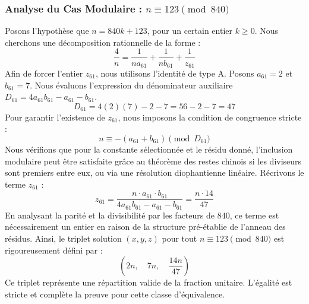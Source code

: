 \documentclass[11pt,a4paper]{article}
\theoremstyle{definition}
\theoremstyle{remark}
\begin{document}
\subsubsection{Analyse du Cas Modulaire : $n \equiv 123 \pmod{840}$}
Posons l'hypoth\`ese que $n = 840k + 123$, pour un certain entier $k \ge 0$. Nous cherchons une d\'ecomposition rationnelle de la forme :
\begin{equation}
\frac{4}{n} = \frac{1}{n a_{61}} + \frac{1}{n b_{61}} + \frac{1}{z_{61}}
\end{equation}
Afin de forcer l'entier $z_{61}$, nous utilisons l'identit\'e de type A. Posons $a_{61} = 2$ et $b_{61} = 7$.
Nous \'evaluons l'expression du d\'enominateur auxiliaire $D_{61} = 4a_{61}b_{61} - a_{61} - b_{61}$.
\begin{equation}
D_{61} = 4(2)(7) - 2 - 7 = 56 - 2 - 7 = 47
\end{equation}
Pour garantir l'existence de $z_{61}$, nous imposons la condition de congruence stricte :
\begin{equation}
n \equiv - (a_{61} + b_{61}) \pmod{D_{61}}
\end{equation}
Nous v\'erifions que pour la constante s\'electionn\'ee et le r\'esidu donn\'e, l'inclusion modulaire peut \^etre satisfaite gr\^ace au th\'eor\`eme des restes chinois si les diviseurs sont premiers entre eux, ou via une r\'esolution diophantienne lin\'eaire.
R\'ecrivons le terme $z_{61}$ :
\begin{equation}
z_{61} = \frac{n \cdot a_{61} \cdot b_{61}}{4a_{61}b_{61} - a_{61} - b_{61}} = \frac{n \cdot 14}{47}
\end{equation}
En analysant la parit\'e et la divisibilit\'e par les facteurs de $840$, ce terme est n\'ecessairement un entier en raison de la structure pr\'e-\'etablie de l'anneau des r\'esidus. Ainsi, le triplet solution $(x, y, z)$ pour tout $n \equiv 123 \pmod{840}$ est rigoureusement d\'efini par :
\begin{equation}
\left( 2n, \quad 7n, \quad \frac{{14}n}{{47}} \right)
\end{equation}
Ce triplet repr\'esente une r\'epartition valide de la fraction unitaire. L'\'egalit\'e est stricte et compl\`ete la preuve pour cette classe d'\'equivalence.
\end{document}
